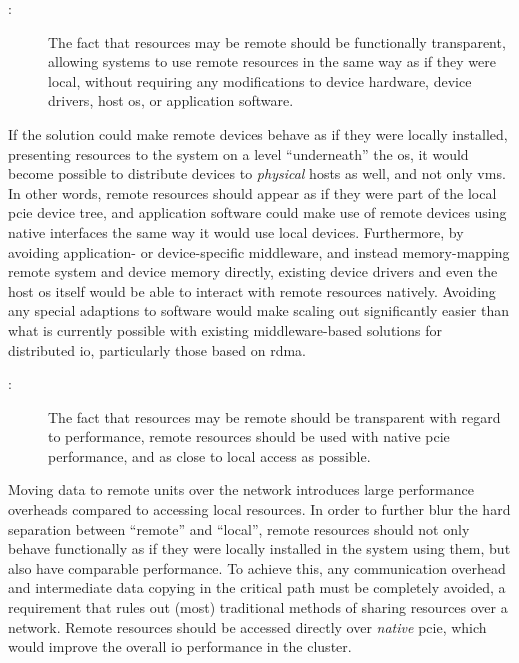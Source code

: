 \begin{description}
    \item[:] The fact that resources may be remote should be functionally transparent, allowing systems to use remote resources in the same way as if they were local, without requiring any modifications to device hardware, device drivers, host \gls{os}, or application software.
\end{description}
If the solution could make remote devices behave as if they were locally installed, presenting resources to the system on a level ``underneath'' the \gls{os}, it would become possible to distribute devices to \emph{physical} hosts as well, and not only \glspl{vm}. 
In other words, remote resources should appear as if they were part of the local \gls{pcie} device tree, and application software could make use of remote devices using native interfaces the same way it would use local devices.
%
Furthermore, by avoiding application- or device-specific \gls{middleware}, and instead memory-mapping remote system and device memory directly, existing device drivers and even the host \gls{os} itself would be able to interact with remote resources natively.
Avoiding any special adaptions to software would make scaling out significantly easier than what is currently possible with existing \gls{middleware}-based solutions for distributed \gls{io}, particularly those based on \gls{rdma}.

\begin{description}    
    \item[:] The fact that resources may be remote should be transparent with regard to performance, remote resources should be used with native \gls{pcie} performance, and as close to local access as possible.
\end{description}
Moving data to remote units over the network introduces large performance overheads compared to accessing local resources. 
In order to further blur the hard separation between ``remote'' and ``local'', remote resources should not only behave functionally as if they were locally installed in the system using them, but also have comparable performance.
To achieve this, any communication overhead and intermediate data copying in the critical path must be completely avoided, a requirement that rules out (most) traditional methods of sharing resources over a network. 
Remote resources should be accessed directly over \emph{native} \gls{pcie}, which would improve the overall \gls{io} performance in the cluster.

